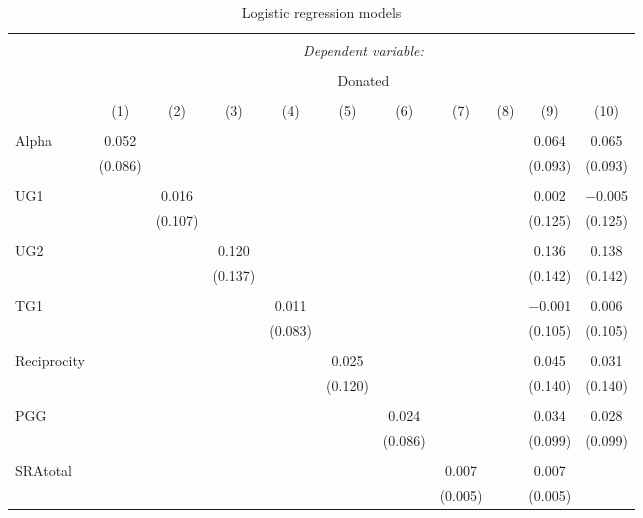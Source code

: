 \documentclass[12pt]{article}
\begin{document}
{\begin{table}[!htbp] \centering 
  \caption{Logistic regression models} 
  \label{} 
              \begin{adjustbox}{width=\textwidth}
\begin{tabular}{@{\extracolsep{5pt}}lcccccccccc} 
\\[-1.8ex]\hline 
\hline \\[-1.8ex] 
 & \multicolumn{10}{c}{\textit{Dependent variable:}} \\ 
\cline{2-11} 
\\[-1.8ex] & \multicolumn{10}{c}{Donated} \\ 
\\[-1.8ex] & (1) & (2) & (3) & (4) & (5) & (6) & (7) & (8) & (9) & (10)\\ 
\hline \\[-1.8ex] 
 Alpha & 0.052 &  &  &  &  &  &  &  & 0.064 & 0.065 \\ 
  & (0.086) &  &  &  &  &  &  &  & (0.093) & (0.093) \\ 
  & & & & & & & & & & \\ 
 UG1 &  & 0.016 &  &  &  &  &  &  & 0.002 & $-$0.005 \\ 
  &  & (0.107) &  &  &  &  &  &  & (0.125) & (0.125) \\ 
  & & & & & & & & & & \\ 
 UG2 &  &  & 0.120 &  &  &  &  &  & 0.136 & 0.138 \\ 
  &  &  & (0.137) &  &  &  &  &  & (0.142) & (0.142) \\ 
  & & & & & & & & & & \\ 
 TG1 &  &  &  & 0.011 &  &  &  &  & $-$0.001 & 0.006 \\ 
  &  &  &  & (0.083) &  &  &  &  & (0.105) & (0.105) \\ 
  & & & & & & & & & & \\ 
 Reciprocity &  &  &  &  & 0.025 &  &  &  & 0.045 & 0.031 \\ 
  &  &  &  &  & (0.120) &  &  &  & (0.140) & (0.140) \\ 
  & & & & & & & & & & \\ 
 PGG &  &  &  &  &  & 0.024 &  &  & 0.034 & 0.028 \\ 
  &  &  &  &  &  & (0.086) &  &  & (0.099) & (0.099) \\ 
  & & & & & & & & & & \\ 
 SRAtotal &  &  &  &  &  &  & 0.007 &  & 0.007 &  \\ 
  &  &  &  &  &  &  & (0.005) &  & (0.005) &  \\ 

\end{tabular}
\end{adjustbox}
\end{table}}
\end{document}
